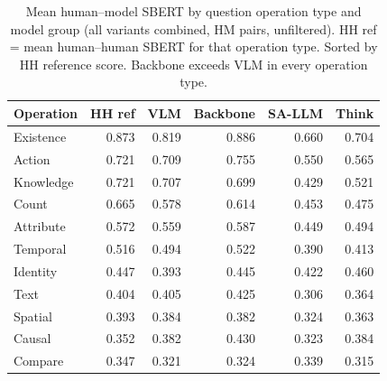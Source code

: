 \begin{table}[h]
\centering
\small
\caption{Mean human--model SBERT by question operation type and model group (all variants combined, HM pairs, unfiltered). HH ref = mean human--human SBERT for that operation type. Sorted by HH reference score. Backbone exceeds VLM in every operation type.}
\label{tab:robustness_op_group}
\begin{tabular}{lrrrrr}
\toprule
Operation & HH ref & VLM & Backbone & SA-LLM & Think \\
\midrule
Existence & 0.873 & 0.819 & 0.886 & 0.660 & 0.704 \\
Action & 0.721 & 0.709 & 0.755 & 0.550 & 0.565 \\
Knowledge & 0.721 & 0.707 & 0.699 & 0.429 & 0.521 \\
Count & 0.665 & 0.578 & 0.614 & 0.453 & 0.475 \\
Attribute & 0.572 & 0.559 & 0.587 & 0.449 & 0.494 \\
Temporal & 0.516 & 0.494 & 0.522 & 0.390 & 0.413 \\
Identity & 0.447 & 0.393 & 0.445 & 0.422 & 0.460 \\
Text & 0.404 & 0.405 & 0.425 & 0.306 & 0.364 \\
Spatial & 0.393 & 0.384 & 0.382 & 0.324 & 0.363 \\
Causal & 0.352 & 0.382 & 0.430 & 0.323 & 0.384 \\
Compare & 0.347 & 0.321 & 0.324 & 0.339 & 0.315 \\
\bottomrule
\end{tabular}
\end{table}
